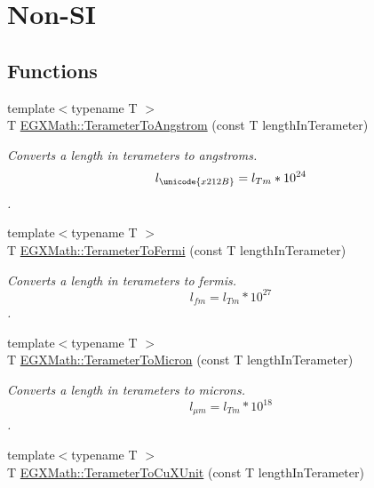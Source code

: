 \hypertarget{group___e_g_x_math-_conversions-_length_conversions-_s_i-_terameter-_non-_s_i}{}\section{Non-\/\+SI}
\label{group___e_g_x_math-_conversions-_length_conversions-_s_i-_terameter-_non-_s_i}
\subsection*{Functions}
\begin{DoxyCompactItemize}
\item 
{\footnotesize template$<$typename T $>$ }\\T \mbox{\hyperlink{group___e_g_x_math-_conversions-_length_conversions-_s_i-_terameter-_non-_s_i_gaab75399e224bea4ea7ddb8bf5f557ee0}{E\+G\+X\+Math\+::\+Terameter\+To\+Angstrom}} (const T length\+In\+Terameter)
\begin{DoxyCompactList}\small\item\em Converts a length in terameters to angstroms. \[ l_{\unicode{x212B}}=l_{Tm} * 10^{24} \]. \end{DoxyCompactList}\item 
{\footnotesize template$<$typename T $>$ }\\T \mbox{\hyperlink{group___e_g_x_math-_conversions-_length_conversions-_s_i-_terameter-_non-_s_i_ga5bf639553e4b6e8520f9345def06e492}{E\+G\+X\+Math\+::\+Terameter\+To\+Fermi}} (const T length\+In\+Terameter)
\begin{DoxyCompactList}\small\item\em Converts a length in terameters to fermis. \[ l_{fm}=l_{Tm} * 10^{27} \]. \end{DoxyCompactList}\item 
{\footnotesize template$<$typename T $>$ }\\T \mbox{\hyperlink{group___e_g_x_math-_conversions-_length_conversions-_s_i-_terameter-_non-_s_i_gaa5fdc4aaf15e6428cf443e3d808403a3}{E\+G\+X\+Math\+::\+Terameter\+To\+Micron}} (const T length\+In\+Terameter)
\begin{DoxyCompactList}\small\item\em Converts a length in terameters to microns. \[ l_{\mu m}=l_{Tm} * 10^{18} \]. \end{DoxyCompactList}\item 
{\footnotesize template$<$typename T $>$ }\\T \mbox{\hyperlink{group___e_g_x_math-_conversions-_length_conversions-_s_i-_terameter-_non-_s_i_ga5eab9d29867c570350691cca342c9472}{E\+G\+X\+Math\+::\+Terameter\+To\+Cu\+X\+Unit}} (const T length\+In\+Terameter)

\end{DoxyCompactItemize}
